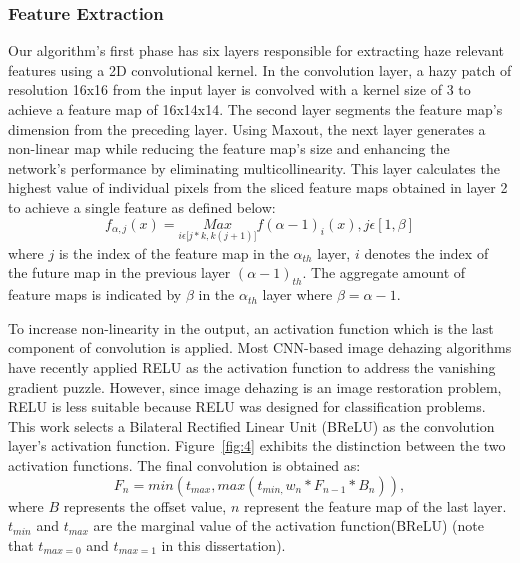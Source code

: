 \documentclass[doctor,english,listoffigures,listoftables]{thesis-uestc}
\begin{document}
\subsubsection{Feature Extraction}
Our algorithm's first phase has six layers responsible for extracting haze relevant features using a 2D convolutional kernel. In the convolution layer, a hazy patch of resolution 16x16 from the input layer is convolved with a kernel size of 3 to achieve a feature map of 16x14x14. The second layer segments the feature map's dimension from the preceding layer. Using Maxout, the next layer generates a non-linear map while reducing the feature map's size and enhancing the network's performance by eliminating multicollinearity. This layer calculates the highest value of individual pixels from the sliced feature maps obtained in layer 2 to achieve a single feature as defined below: 
\begin{equation}
f_{ \alpha,j}(x)=\underset{i \epsilon {\big[j*k,k(j+1) \big]}}{Max} f( \alpha-1)_i (x), j \epsilon [1, \beta] 
\end{equation}	
where $j$ is the index of the feature map in the $ \alpha_{th}$ layer, $i$ denotes the index of the future map in the previous layer $(\alpha-1)_{th}$. The aggregate amount of feature maps is indicated by $\beta$ in the $ \alpha_{th}$ layer where $\beta = \alpha-1$. 
\par
To increase non-linearity in the output, an activation function which is the last component of convolution is applied. Most CNN-based image dehazing algorithms have recently applied RELU as the activation function to address the vanishing gradient puzzle. However, since image dehazing is an image restoration problem, RELU is less suitable because RELU was designed for classification problems. This work selects a Bilateral Rectified Linear Unit (BReLU) as the convolution layer's activation function. Figure~\ref{fig:4} exhibits the distinction between the two activation functions. The final convolution is obtained as:
\begin{equation}
	F_n= min(t_{max}, max(t_{min,}w_n*F_{n-1}*B_n)),
\end{equation}	
where $B$ represents the offset value, $n$ represent the feature map of the last layer. $t_{min}$ and $t_{max}$ are the marginal value of the activation function(BReLU) (note that $t_{max=0}$ and $t_{max=1}$ in this dissertation). 
\end{document}
